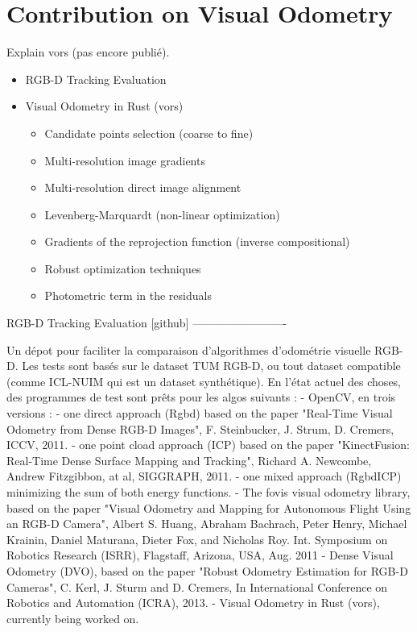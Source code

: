 \chapter{Contribution on Visual Odometry}%
\label{cha:vors}

\minitoc%

Explain vors (pas encore publié).

\begin{itemize}
	\item RGB-D Tracking Evaluation
	\item Visual Odometry in Rust (vors)
	\begin{itemize}
		\item Candidate points selection (coarse to fine)
		\item Multi-resolution image gradients
		\item Multi-resolution direct image alignment
		\item Levenberg-Marquardt (non-linear optimization)
		\item Gradients of the reprojection function (inverse compositional)
		\item Robust optimization techniques
		\item Photometric term in the residuals
	\end{itemize}
\end{itemize}


RGB-D Tracking Evaluation [github]
-------------------------

Un dépot pour faciliter la comparaison d’algorithmes d’odométrie visuelle RGB-D. Les tests sont basés sur le dataset TUM RGB-D, ou tout dataset compatible (comme ICL-NUIM qui est un dataset synthétique). En l’état actuel des choses, des programmes de test sont prêts pour les algos suivants :
- OpenCV, en trois versions :
  - one direct approach (Rgbd) based on the paper "Real-Time Visual Odometry from Dense RGB-D Images", F. Steinbucker, J. Strum, D. Cremers, ICCV, 2011.
  - one point cload approach (ICP) based on the paper "KinectFusion: Real-Time Dense Surface Mapping and Tracking", Richard A. Newcombe, Andrew Fitzgibbon, at al, SIGGRAPH, 2011.
  - one mixed approach (RgbdICP) minimizing the sum of both energy functions.
- The fovis visual odometry library, based on the paper "Visual Odometry and Mapping for Autonomous Flight Using an RGB-D Camera", Albert S. Huang, Abraham Bachrach, Peter Henry, Michael Krainin, Daniel Maturana, Dieter Fox, and Nicholas Roy. Int. Symposium on Robotics Research (ISRR), Flagstaff, Arizona, USA, Aug. 2011
- Dense Visual Odometry (DVO), based on the paper "Robust Odometry Estimation for RGB-D Cameras", C. Kerl, J. Sturm and D. Cremers, In International Conference on Robotics and Automation (ICRA), 2013.
- Visual Odometry in Rust (vors), currently being worked on.

